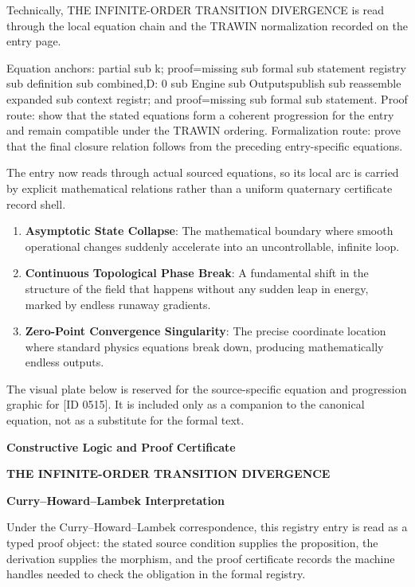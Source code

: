 Technically, THE INFINITE-ORDER TRANSITION DIVERGENCE is read through the local equation chain and the TRAWIN normalization recorded on the entry page.

Equation anchors: partial sub k; proof=missing sub formal sub statement registry sub definition sub combined,D: 0 sub Engine sub Outputspublish sub reassemble expanded sub context registr; and proof=missing sub formal sub statement. Proof route: show that the stated equations form a coherent progression for the entry and remain compatible under the TRAWIN ordering. Formalization route: prove that the final closure relation follows from the preceding entry-specific equations.

The entry now reads through actual sourced equations, so its local arc is carried by explicit mathematical relations rather than a uniform quaternary certificate record shell.
\endgroup

\begin{enumerate}[leftmargin=1.6em,itemsep=6pt,topsep=4pt]
\item \textbf{Asymptotic State Collapse}: The mathematical boundary where smooth operational changes suddenly accelerate into an uncontrollable, infinite loop.
\item \textbf{Continuous Topological Phase Break}: A fundamental shift in the structure of the field that happens without any sudden leap in energy, marked by endless runaway gradients.
\item \textbf{Zero-Point Convergence Singularity}: The precise coordinate location where standard physics equations break down, producing mathematically endless outputs.
\end{enumerate}

\begingroup\footnotesize\sloppy
The visual plate below is reserved for the source-specific equation and progression graphic for [ID 0515]. It is included only as a companion to the canonical equation, not as a substitute for the formal text.
\par\endgroup
\ifTZPDarkEdition
{}
\fi

\clearpage
\begingroup\tzpsupportsetup
\noindent\textbf{\fontsize{10.8pt}{12.8pt}\selectfont [ID 0515] Constructive Logic and Proof Certificate}\par
\noindent\textbf{\fontsize{10pt}{12pt}\selectfont THE INFINITE-ORDER TRANSITION DIVERGENCE}\par
\vspace{0.45em}
\begingroup
\footnotesize
\setlength{\parskip}{0.22em}
\setlength{\parindent}{0pt}
\noindent\textbf{Curry--Howard--Lambek Interpretation}\par
Under the Curry--Howard--Lambek correspondence, this registry entry is read as a typed proof
object: the stated source condition supplies the proposition, the derivation supplies the
morphism, and the proof certificate records the machine handles needed to check the obligation
in the formal registry.

